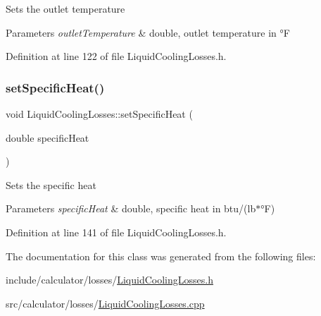 Sets the outlet temperature


\begin{DoxyParams}{Parameters}
{\em outlet\+Temperature} & double, outlet temperature in °F \\
\hline
\end{DoxyParams}


Definition at line 122 of file Liquid\+Cooling\+Losses.\+h.

\mbox{\label{class_liquid_cooling_losses_a38ff1ff4dc0de69c72db094bf2259993}} 
\subsubsection{\texorpdfstring{set\+Specific\+Heat()}{setSpecificHeat()}}
{\footnotesize\ttfamily void Liquid\+Cooling\+Losses\+::set\+Specific\+Heat (\begin{DoxyParamCaption}\item[{double}]{specific\+Heat }\end{DoxyParamCaption})\hspace{0.3cm}{\ttfamily [inline]}}

Sets the specific heat


\begin{DoxyParams}{Parameters}
{\em specific\+Heat} & double, specific heat in btu/(lb$\ast$°F) \\
\hline
\end{DoxyParams}


Definition at line 141 of file Liquid\+Cooling\+Losses.\+h.



The documentation for this class was generated from the following files\+:\begin{DoxyCompactItemize}
\item 
include/calculator/losses/\hyperlink{_liquid_cooling_losses_8h}{Liquid\+Cooling\+Losses.\+h}\item 
src/calculator/losses/\hyperlink{_liquid_cooling_losses_8cpp}{Liquid\+Cooling\+Losses.\+cpp}\end{DoxyCompactItemize}
